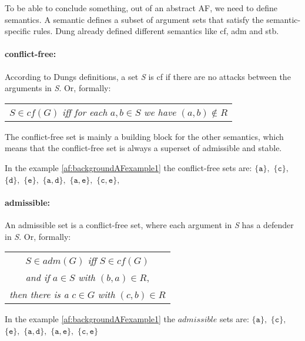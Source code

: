 To be able to conclude something, out of an abstract AF, we need to define semantics. A semantic defines a subset of argument sets that satisfy the semantic-specific rules. Dung already defined different semantics \cite{Dung1995-DUNOTA-2} like \ac{cf}, \ac{adm} and \ac{stb}. 

\paragraph{conflict-free:} According to Dungs definitions, a set \textit{S} is \ac{cf} if there are no attacks between the arguments in \textit{S}. Or, formally:

\begin{center}
    \begin{tabular}{c}
        $S \in cf(G)$ \textit{iff for each} $a, b \in S$ \textit{we have} $(a, b) \not\in R$
    \end{tabular}
\end{center}

The conflict-free set is mainly a building block for the other semantics, which means that the conflict-free set is always a superset of admissible and stable.

In the example \ref{af:backgroundAFexample1} the conflict-free sets are:
$\mathtt{\{a\}},$
$\mathtt{\{c\}},$
$\mathtt{\{d\}},$
$\mathtt{\{e\}},$
$\mathtt{\{a, d\}},$
$\mathtt{\{a, e\}},$
$\mathtt{\{c, e\}},$

\paragraph{admissible:} An admissible set is a conflict-free set, where each argument in \textit{S} has a defender in \textit{S}. Or, formally:

\begin{center}
    \begin{tabular}{c}
        $S \in adm(G)$ \textit{iff} $S \in cf(G)$\\

        \textit{and if} $a \in S$ \textit{with} $(b, a) \in R$,\\

        \textit{then there is a} $c \in G$ \textit{with} $(c, b) \in R$
    \end{tabular}
\end{center}

In the example \ref{af:backgroundAFexample1} the $admissible$ sets are:
$\mathtt{\{a\}},$
$\mathtt{\{c\}},$
$\mathtt{\{e\}},$
$\mathtt{\{a, d\}},$
$\mathtt{\{a, e\}},$
$\mathtt{\{c, e\}}$


